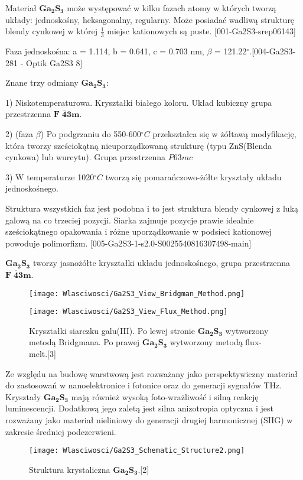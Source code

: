 Materiał $\mathbf{Ga_{2}S_{3}}$ może występować w kilku fazach atomy w których tworzą układy: jednoskośny, heksagonalny, regularny. Może posiadać wadliwą strukturę blendy cynkowej w której $\frac{1}{3}$ miejsc kationowych są puste.
[001-Ga2S3-srep06143]

Faza jednoskośna: a = 1.114, b = 0.641, c = 0.703 nm, $\beta$ = 121.22$^\circ$.[004-Ga2S3-281 - Optik Ga2S3 8]

Znane trzy odmiany $\mathbf{Ga_{2}S_{3}}$:

1) Niskotemperaturowa. Kryształki białego koloru. Układ kubiczny grupa przestrzenna $\mathbf{F\;\overline{4}3m}$.

2) (faza $\beta$) Po podgrzaniu do 550-600$^\circ C$ przekształca się w żółtawą modyfikację, która
tworzy sześciokątną nieuporządkowaną strukturę (typu ZnS(Blenda cynkowa) lub wurcytu). Grupa przestrzenna $P63mc$

3) W temperaturze 1020$^\circ C$ tworzą się pomarańczowo-żółte kryształy układu jednoskośnego.

Struktura wszystkich faz jest podobna i to jest struktura blendy cynkowej z luką galową na co trzeciej pozycji. Siarka zajmuje
pozycje prawie idealnie sześciokątnego opakowania i różne
uporządkowanie w podsieci kationowej powoduje polimorfizm.	 
[005-Ga2S3-1-s2.0-S0025540816307498-main]

$\mathbf{Ga_{2}S_{3}}$ tworzy jasnożółte kryształki układu jednoskośnego, grupa przestrzenna
$\mathbf{F\;\overline{4}3m}$.
\begin{figure}[H]
	\begin{center}
		\begin{minipage}[h]{0.3\linewidth}
			\texttt{[image: Wlasciwosci/Ga2S3\_View\_Bridgman\_Method.png]}
		\end{minipage}
		\begin{minipage}[h]{0.3\linewidth}
			\texttt{[image: Wlasciwosci/Ga2S3\_View\_Flux\_Method.png]}
		\end{minipage}
		\caption{Kryształki siarczku galu(III). Po lewej stronie $\mathbf{Ga_{2}S_{3}}$ wytworzony metodą Bridgmana. Po prawej $\mathbf{Ga_{2}S_{3}}$ wytworzony metodą flux-melt.[3]}
	\end{center}
\end{figure}
 Ze względu na budowę warstwową jest rozważany jako perspektywiczny materiał do zastosowań w nanoelektronice i fotonice oraz do generacji sygnałów THz.
 Kryształy $\mathbf{Ga_{2}S_{3}}$ mają również wysoką foto-wrażliwość i silną reakcję luminescencji. 
   Dodatkową jego zaletą jest silna anizotropia optyczna i jest rozważany jako materiał nieliniowy do generacji drugiej harmonicznej (SHG) w zakresie średniej podczerwieni.
\begin{figure}[H]
	\begin{center}
		\texttt{[image: Wlasciwosci/Ga2S3\_Schematic\_Structure2.png]}
		\caption{Struktura krystaliczna $\mathbf{Ga_{2}S_{3}}$.[2]}
	\end{center}
\end{figure}




